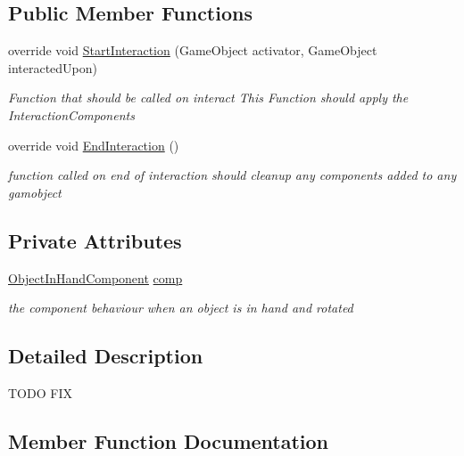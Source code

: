 \subsection*{Public Member Functions}
\begin{DoxyCompactItemize}
\item 
override void \mbox{\hyperlink{class_obejct_in_hand_interaction_a9046df053628946f7ce5f4e484097482}{Start\+Interaction}} (Game\+Object activator, Game\+Object interacted\+Upon)
\begin{DoxyCompactList}\small\item\em Function that should be called on interact This Function should apply the Interaction\+Components \end{DoxyCompactList}\item 
override void \mbox{\hyperlink{class_obejct_in_hand_interaction_a67633fc3c21606d209e8e54db5c516a9}{End\+Interaction}} ()
\begin{DoxyCompactList}\small\item\em function called on end of interaction should cleanup any components added to any gamobject \end{DoxyCompactList}\end{DoxyCompactItemize}
\subsection*{Private Attributes}
\begin{DoxyCompactItemize}
\item 
\mbox{\hyperlink{class_object_in_hand_component}{Object\+In\+Hand\+Component}} \mbox{\hyperlink{class_obejct_in_hand_interaction_a3efd026997c61e49e9ffd3f26e1c80dd}{comp}}
\begin{DoxyCompactList}\small\item\em the component behaviour when an object is in hand and rotated \end{DoxyCompactList}\end{DoxyCompactItemize}


\subsection{Detailed Description}
T\+O\+DO F\+IX 



\subsection{Member Function Documentation}
\mbox{\label{class_obejct_in_hand_interaction_a67633fc3c21606d209e8e54db5c516a9}} 
